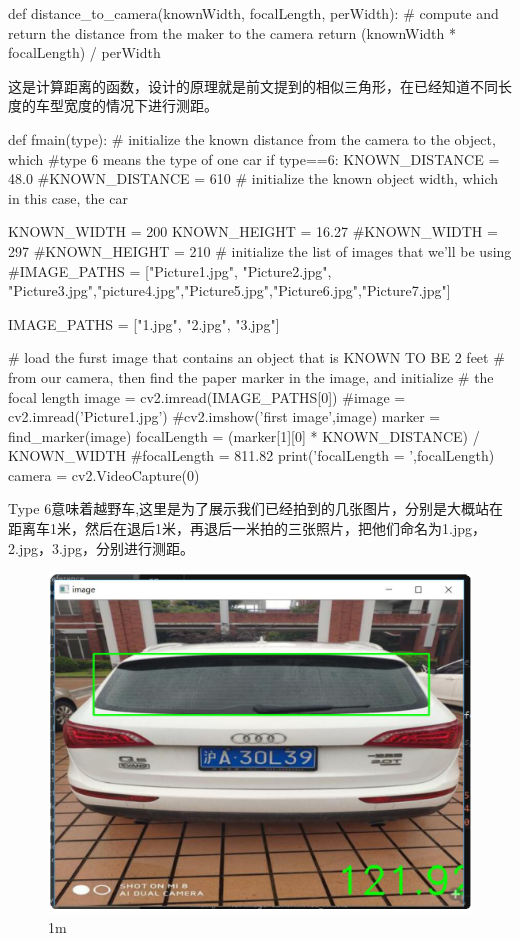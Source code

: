 \documentclass[12pt]{report}
\begin{document}
\begin{python}
def distance_to_camera(knownWidth, focalLength, perWidth):  
    # compute and return the distance from the maker to the camera
    return (knownWidth * focalLength) / perWidth            
\end{python}

这是计算距离的函数，设计的原理就是前文提到的相似三角形，在已经知道不同长度的车型宽度的情况下进行测距。

\begin{python}
def fmain(type):
# initialize the known distance from the camera to the object, which
#type 6 means the type of one car
  if type==6:
    KNOWN_DISTANCE = 48.0
    #KNOWN_DISTANCE = 610
    # initialize the known object width, which in this case, the car

    KNOWN_WIDTH = 200
    KNOWN_HEIGHT = 16.27
    #KNOWN_WIDTH = 297
    #KNOWN_HEIGHT = 210
    # initialize the list of images that we'll be using
    #IMAGE_PATHS = ["Picture1.jpg", "Picture2.jpg", "Picture3.jpg","picture4.jpg","Picture5.jpg","Picture6.jpg","Picture7.jpg"]

    IMAGE_PATHS = ["1.jpg", "2.jpg", "3.jpg"]

# load the furst image that contains an object that is KNOWN TO BE 2 feet
# from our camera, then find the paper marker in the image, and initialize
# the focal length
    image = cv2.imread(IMAGE_PATHS[0])
#image = cv2.imread('Picture1.jpg')
#cv2.imshow('first image',image)   
    marker = find_marker(image)
    focalLength = (marker[1][0] * KNOWN_DISTANCE) / KNOWN_WIDTH
#focalLength = 811.82
    print('focalLength = ',focalLength)
    camera = cv2.VideoCapture(0)
\end{python}
Type 6意味着越野车,这里是为了展示我们已经拍到的几张图片，分别是大概站在距离车1米，然后在退后1米，再退后一米拍的三张照片，把他们命名为1.jpg，2.jpg，3.jpg，分别进行测距。
\newpage
\begin{figure}[h]

  \centering
  \includegraphics[scale=0.3]{11.png} %
  \caption{1m} %
  \label{Distance} %
\end{figure}
\end{document}
